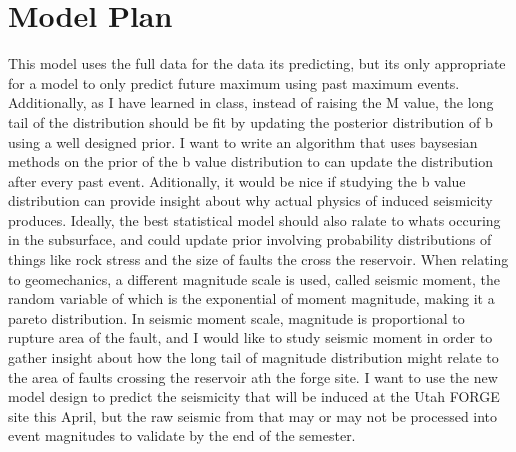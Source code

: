 \documentclass{article}
\begin{document}
\section{Model Plan}
    This  model uses the full data for the data its predicting, but its only appropriate for a model to only predict future maximum using past maximum events. 
    Additionally, as I have learned in class, instead of raising the M value, the long tail of the distribution should be fit by updating the posterior  distribution of b 
    using a well designed prior. I want to write an algorithm that uses baysesian methods on the prior of the b value distribution to can update the distribution after every past event.
    Aditionally, it would be nice if studying the b value distribution can provide insight about why actual physics of induced seismicity produces. Ideally, 
    the best statistical model should also ralate to whats occuring in the subsurface, and could update prior involving probability distributions of things like rock stress
    and the size of faults the cross the reservoir. When relating to geomechanics, a different magnitude scale is used, called seismic moment, the random variable of which is the exponential 
    of moment magnitude, making it a pareto distribution. In seismic moment scale, magnitude is proportional to rupture area of the fault, and I would like to study seismic moment     
    in order to gather insight about how the long tail of magnitude distribution might relate to the area of faults crossing the reservoir ath the forge site.  
    I want to use the new model design to predict the seismicity that will be induced at the Utah FORGE site this April, but the raw seismic from that may or may not be processed into     
    event magnitudes to validate by the end of the semester. 
    \printbibliography
\end{document}
